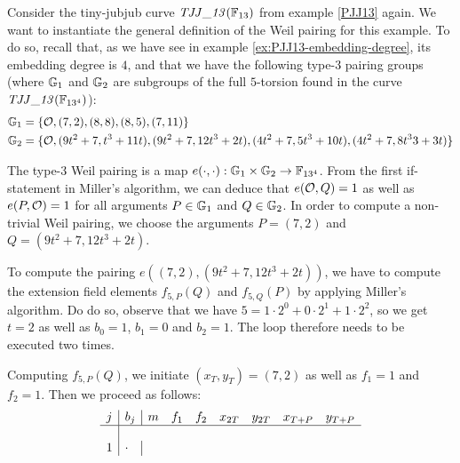 \begin{example} Consider the tiny-jubjub curve $\mathit{TJJ\_13}(\mathbb{F}_{13})$ from example \ref{PJJ13} again. We want to instantiate the general definition of the Weil pairing for this example. To do so, recall that, as we have see in example \ref{ex:PJJ13-embedding-degree}, its embedding degree is $4$, and that we have the following type-3 pairing groups (where $\mathbb{G}_1$ and $\mathbb{G}_2$ are subgroups of the full $5$-torsion found in the curve $\mathit{TJJ\_13}(\mathbb{F}_{13^4})$):
\begin{align*}
\mathbb{G}_1 & = \{\mathcal{O}, (7,2), (8,8), (8,5), (7,11)\}\\
\mathbb{G}_2 & = \{\mathcal{O}, (9t^2 + 7,t^3 + 11t), (9t^2 + 7, 12t^3 + 2t), 
(4t^2 + 7, 5t^3 + 10t), (4t^2 + 7, 8t^33 + 3t)\}
\end{align*}

The type-3 Weil pairing is a map $e(\cdot,\cdot): \mathbb{G}_1 \times \mathbb{G}_2 \to \mathbb{F}_{13^4}$. From the first if-statement in Miller's algorithm, we can deduce that 
$e(\mathcal{O},Q)=1$ as well as $e(P,\mathcal{O})=1$ for all arguments $P\in\mathbb{G}_1$ and $Q\in \mathbb{G}_2$. In order to compute a non-trivial Weil pairing, we choose the arguments 
$P=(7,2)$ and $Q=(9t^2 + 7, 12t^3 + 2t)$. 

To compute the pairing $e((7,2),(9t^2 + 7, 12t^3 + 2t))$, we have to compute the extension field elements $f_{5,P}(Q)$ and $f_{5,Q}(P)$ by applying Miller's algorithm. Do do so, observe that we have $5 = 1\cdot 2^0 + 0 \cdot 2^1 + 1\cdot 2^2$, so we get $t=2$ as well as $b_0=1$, $b_1=0$ and $b_2=1$. The loop therefore needs to be executed two times. 

Computing $f_{5,P}(Q)$, we initiate $(x_T,y_T) = (7,2)$ as well as $f_1=1$ and $f_2=1$. Then we proceed as follows:
$$
\begin{array}{l|l|lllllll}
j & b_j & m & f_1 & f_2 & x_{2T} & y_{2T} & x_{T+P} & y_{T+P}\\
\hline\\
1 & \cdot & 
\end{array}
$$


\end{example}
